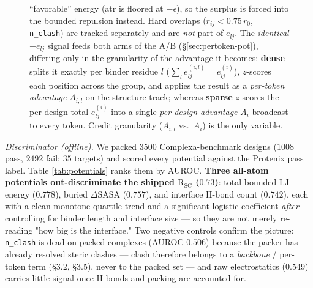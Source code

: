 \documentclass[11pt]{article}
\newcommand{\R}{\mathrm{R}}
\newcommand{\SC}{\mathrm{SC}}
\newcommand{\ttk}[1]{\texttt{\small #1}}
\begin{document}
\begin{figure}[htbp]
{``favorable'' energy (\textcolor{aLine}{atr} is floored at $-\epsilon$), so the surplus is forced
into the bounded \textcolor{bLine}{repulsion} instead. Hard overlaps ($r_{ij}<0.75\,r_0$,
\ttk{n\_clash}) are tracked separately and are \emph{not} part of $e_{lj}$. The \emph{identical}
$-e_{lj}$ signal feeds both arms of the A/B (\S\ref{sec:pertoken-pot}), differing only in the
granularity of the advantage it becomes: \textcolor{dLine}{\textbf{dense}} splits it exactly per
binder residue $l$ ($\sum_l e_{lj}^{(i,l)}=e_{lj}^{(i)}$), $z$-scores each position across the group,
and applies the result as a \emph{per-token advantage} $A_{i,l}$ on the structure track; whereas
\textcolor{lfLine}{\textbf{sparse}} $z$-scores the per-design total $e_{lj}^{(i)}$ into a single
\emph{per-design advantage} $A_i$ broadcast to every token. Credit granularity
($A_{i,l}$ vs.\ $A_i$) is the only variable.}
\label{fig:elj-compute}
\end{figure}

\emph{Discriminator (offline).} We packed $3500$ Complexa-benchmark designs ($1008$ pass, $2492$
fail; $35$ targets) and scored every potential against the Protenix pass label. Table
\ref{tab:potentials} ranks them by AUROC. \textbf{Three all-atom potentials out-discriminate the
shipped $\R_{\SC}$ ($0.73$)}: total bounded LJ energy ($0.778$), buried $\Delta$SASA ($0.757$), and
interface H-bond count ($0.742$), each with a clean monotone quartile trend and a significant
logistic coefficient \emph{after} controlling for binder length and interface size --- so they are
not merely re-reading "how big is the interface." Two negative controls confirm the picture:
\ttk{n\_clash} is dead on packed complexes (AUROC $0.506$) because the packer has already resolved
steric clashes --- clash therefore belongs to a \emph{backbone} / per-token term (\S3.2, \S3.5),
never to the packed set --- and raw electrostatics ($0.549$) carries little signal once H-bonds and
packing are accounted for.
\end{document}
